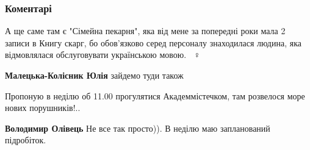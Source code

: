  
 
 
 
 
\subsubsection{Коментарі}

\begin{itemize}
 

А ще саме там є "Сімейна пекарня", яка від мене за попередні роки мала 2 записи
в Книгу скарг, бо обов'язково серед персоналу знаходилася людина, яка
відмовлялася обслуговувати українською мовою. 🤷🏻♀️

\begin{itemize}
 
\textbf{Малецька-Колісник Юлія} зайдемо туди також

 
Пропоную в неділю об 11.00 прогулятися Академмістечком, там розвелося море нових порушників!..

\begin{itemize}
 
\textbf{Володимир Олівець} Не все так просто)). В неділю маю запланований підробіток.


\end{itemize}
\end{itemize}
\end{itemize}
